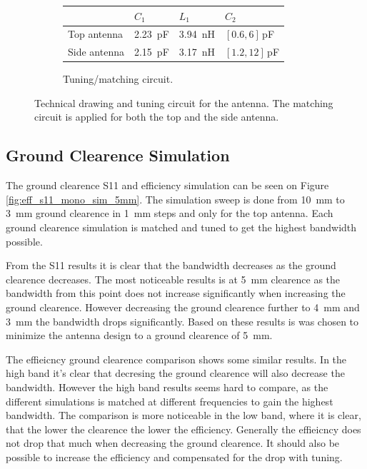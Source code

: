 \begin{figure}[htbp]
\begin{subfigure}[b]{0.49\linewidth}
\footnotesize
        \begin{tabular}{|l|l|l|l|}
            \hline
            & $C_1$ & $L_1$ & $C_2$ \\
            \hline
            Top antenna & \SI{2.23}{pF} & \SI{3.94}{nH} & $[0.6,6]\,$pF\\
            Side antenna & \SI{2.15}{pF} & \SI{3,17}{nH} & $[1.2,12]\,$pF\\
            \hline
        \end{tabular}
        \caption{Tuning/matching circuit.}
        \label{fig:ant1_tuning}
    \end{subfigure}
    \caption{Technical drawing and tuning circuit for the antenna.  The matching circuit is applied for both the top and the side antenna.}
    \label{fig:ant1techschem_6pf}
\end{figure}

\subsection{Ground Clearence Simulation}
The ground clearence S11 and efficiency simulation can be seen on Figure \ref{fig:eff_s11_mono_sim_5mm}.
The simulation sweep is done from \SI{10}{mm} to \SI{3}{mm} ground clearence in \SI{1}{mm} steps and only for the top antenna. Each ground clearence simulation is matched and tuned to get the highest bandwidth possible.

From the S11 results it is clear that the bandwidth decreases as the ground clearence decreases. The most noticeable results is at \SI{5}{mm} clearence as the bandwidth from this point does not increase significantly when increasing the ground clearence. However decreasing the ground clearence further to \SI{4}{mm} and \SI{3}{mm} the bandwidth drops significantly. Based on these results is was chosen to minimize the antenna design to a ground clearence of \SI{5}{mm}.

The effieicncy ground clearence comparison shows some similar results. In the high band it's clear that decresing the ground clearence will also decrease the bandwidth. However the high band results seems hard to compare, as the different simulations is matched at different frequencies to gain the highest bandwidth. The comparison is more noticeable in the low band, where it is clear, that the lower the clearence the lower the efficiency. Generally the effieicncy does not drop that much when decreasing the ground clearence. It should also be possible to increase the efficiency and compensated for the drop with tuning.  

